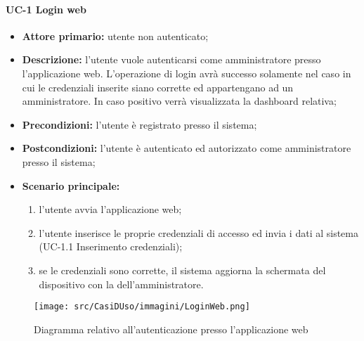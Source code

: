 
\paragraph{UC-1 Login web}
\begin{itemize}
	\item \textbf{Attore primario:} utente non autenticato; 

	\item \textbf{Descrizione:} l'utente vuole autenticarsi come amministratore presso l'applicazione web. L'operazione di login avrà successo solamente nel caso in cui le credenziali inserite siano corrette ed appartengano ad un amministratore. In caso positivo verrà visualizzata la dashboard relativa;

	\item \textbf{Precondizioni:} l'utente è registrato presso il sistema;

	\item \textbf{Postcondizioni:} l'utente è autenticato ed autorizzato come amministratore presso il sistema;

	\item \textbf{Scenario principale:}
	      \begin{enumerate}
		      \item l'utente avvia l'applicazione web;
		      \item l'utente inserisce le proprie credenziali di accesso ed invia i dati al sistema (UC-1.1 Inserimento credenziali);
		      \item se le credenziali sono corrette, il sistema aggiorna la schermata del dispositivo con la  dell'amministratore.
	      \end{enumerate}
\end{itemize}

\begin{figure}[H]
    \centering
      \texttt{[image: src/CasiDUso/immagini/LoginWeb.png]}
    \caption{Diagramma relativo all'autenticazione presso l'applicazione web}
\end{figure}


